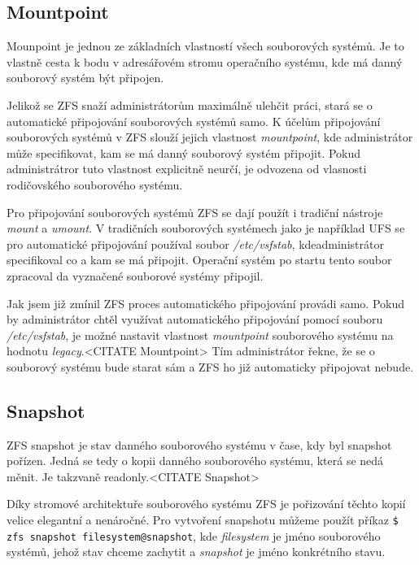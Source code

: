     \subsection{Mountpoint}
    \label{mountpoint}
    Mounpoint je jednou ze základních vlastností všech souborových systémů. Je to vlastně cesta k bodu v adresářovém stromu operačního systému, kde má danný souborový systém být připojen.

    Jelikož se ZFS snaží administrátorům maximálně ulehčit práci, stará se o automatické připojování souborových systémů samo. K účelům připojování souborových systémů v ZFS slouží jejich vlastnost \emph{mountpoint}, kde administrátor může specifikovat, kam se má danný souborový systém připojit. Pokud administrátror tuto vlastnost explicitně neurčí, je odvozena od vlasnosti rodičovského souborového systému.

    Pro připojování souborových systémů ZFS se dají použít i tradiční nástroje \emph{mount} a \emph{umount}. V tradičních souborových systémech jako je například UFS se pro automatické připojování používal soubor \emph{/etc/vsfstab}, kdeadministrátor specifikoval co a kam se má připojit. Operační systém po startu tento soubor zpracoval da vyznačené souborové systémy připojil.

    Jak jsem již zmínil ZFS proces automatického připojování provádi samo. Pokud by administrátor chtěl využívat automatického připojování pomocí souboru \emph{/etc/vsfstab}, je možné nastavit vlastnost \emph{mountpoint} souborového systému na hodnotu \emph{legacy}.<CITATE Mountpoint> Tím administrátor řekne, že se o souborový systému bude starat sám a ZFS ho již automaticky připojovat nebude.
    \subsection{Snapshot}
    \label{snapshot}
    ZFS snapshot je stav danného souborového systému v čase, kdy byl snapshot pořízen. Jedná se tedy o kopii danného souborového systému, která se nedá měnit. Je takzvaně readonly.<CITATE Snapshot>
    
    Díky stromové architektuře souborového systému ZFS je pořizování těchto kopií velice elegantní a nenáročné. Pro vytvoření snapshotu můžeme použít příkaz \verb|$ zfs snapshot filesystem@snapshot|, kde \emph{filesystem} je jméno souborového systémů, jehož stav chceme zachytit a \emph{snapshot} je jméno konkrétního stavu.
     
